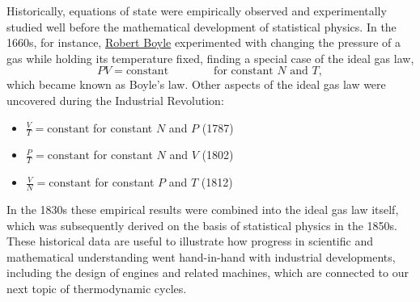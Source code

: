 Historically, equations of state were empirically observed and experimentally studied well before the mathematical development of statistical physics.
In the 1660s, for instance, \href{https://en.wikipedia.org/wiki/Robert_Boyle}{Robert Boyle} experimented with changing the pressure of a gas while holding its temperature fixed, finding a special case of the ideal gas law,
\begin{equation*}
  PV = \mbox{constant} \qquad\qquad \mbox{for constant } N \mbox{ and } T,
\end{equation*}
which became known as Boyle's law.
Other aspects of the ideal gas law were uncovered during the Industrial Revolution:
 \\[-24 pt]
\begin{itemize}
  \item $\displaystyle \frac{V}{T} = \mbox{constant}$ for constant $N$ and $P$ (1787) %
  \item $\displaystyle \frac{P}{T} = \mbox{constant}$ for constant $N$ and $V$ (1802) %
  \item $\displaystyle \frac{V}{N} = \mbox{constant}$ for constant $P$ and $T$ (1812) %
\end{itemize}
In the 1830s these empirical results were combined into the ideal gas law itself, which was subsequently derived on the basis of statistical physics in the 1850s. %
These historical data are useful to illustrate how progress in scientific and mathematical understanding went hand-in-hand with industrial developments, including the design of engines and related machines, which are connected to our next topic of thermodynamic cycles.

